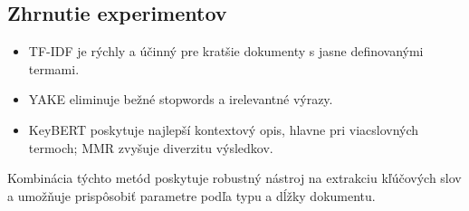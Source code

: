 \documentclass[a4paper,12pt]{article}
\begin{document}
\subsection{Zhrnutie experimentov}

\begin{itemize}
    \item TF-IDF je rýchly a účinný pre kratšie dokumenty s jasne definovanými termami.
    \item YAKE eliminuje bežné stopwords a irelevantné výrazy.
    \item KeyBERT poskytuje najlepší kontextový opis, hlavne pri viacslovných termoch; MMR zvyšuje diverzitu výsledkov.
\end{itemize}

\noindent
Kombinácia týchto metód poskytuje robustný nástroj na extrakciu kľúčových slov a umožňuje prispôsobiť parametre podľa typu a dĺžky dokumentu.

\clearpage
\printbibliography[heading=bibnumbered]
\end{document}
